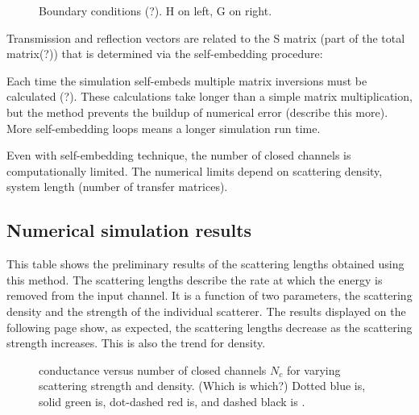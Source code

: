 
\begin{figure}
\vskip -0.5cm
\centerline{
\quad \quad \quad \quad
{}}
\vskip -0.5cm
\caption{Boundary conditions (?). H on left, G on right.}
\label{fig:HGmatrix}
\end{figure}

Transmission and reflection vectors are related to the S matrix
(part of the total matrix(?)) that is determined via the self-embedding procedure:

Each time the simulation self-embeds multiple matrix inversions must
be calculated (?).  These calculations take longer than a simple matrix
multiplication, but the method prevents the buildup of numerical
error (describe this more).  More self-embedding loops means a longer simulation run time.

Even with self-embedding technique, the number of closed channels is computationally limited.
The numerical limits depend on scattering density, system length (number of transfer matrices).

\subsection {Numerical simulation results}
%

This table shows the preliminary results of the scattering lengths
obtained using this method.  The scattering lengths describe the rate at which
the energy is removed from the input channel.  It is a function of two
parameters, the scattering density and the strength of the individual
scatterer.  The results displayed on the following page show, as expected,
the scattering lengths decrease as the scattering strength increases.  This is
also the trend for density.

\begin{figure}
\vskip -0.5cm
\centerline{
}
\vskip -0.5cm
\caption{conductance versus number of closed channels $N_c$ for varying
scattering strength and density. (Which is which?) Dotted blue is, solid
green is, dot-dashed red is, and dashed black is .}
\label{fig:gVersusNc}
\end{figure}

